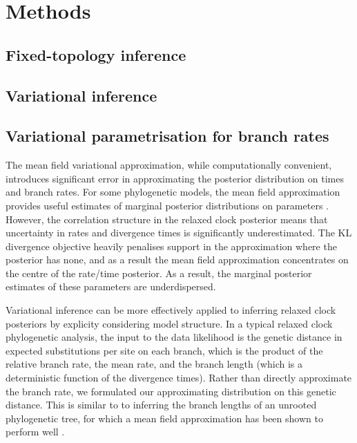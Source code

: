 \section*{Methods}

\subsection*{Fixed-topology inference}


\subsection*{Variational inference}


\subsection*{Variational parametrisation for branch rates}

The mean field variational approximation, while computationally convenient, introduces significant error in approximating the posterior distribution on times and branch rates. For some phylogenetic models, the mean field approximation provides useful estimates of marginal posterior distributions on parameters \cite{fourment2019evaluating}. However, the correlation structure in the relaxed clock posterior means that uncertainty in rates and divergence times is significantly underestimated. The KL divergence objective heavily penalises support in the approximation where the posterior has none, and as a result the mean field approximation concentrates on the centre of the rate/time posterior. As a result, the marginal posterior estimates of these parameters are underdispersed.

Variational inference can be more effectively applied to inferring relaxed clock posteriors by explicity considering model structure. In a typical relaxed clock phylogenetic analysis, the input to the data likelihood is the genetic distance in expected substitutions per site on each branch, which is the product of the relative branch rate, the mean rate, and the branch length (which is a deterministic function of the divergence times). Rather than directly approximate the branch rate, we formulated our approximating distribution on this genetic distance. This is similar to to inferring the branch lengths of an unrooted phylogenetic tree, for which a mean field approximation has been shown to perform well \cite{zhang2018variational}.

